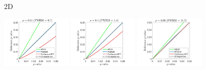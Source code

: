 \documentclass{article}
\begin{document}
\begin{figure}[!htp]
\centering
\begin{sideways}
\phantom{------------------}2D
\end{sideways}
\includegraphics[trim=80 5 80 5, clip,width=0.3\textwidth]{figure/2D_rho0.01_disc.jpg}
\includegraphics[trim=80 5 80 5, clip,width=0.3\textwidth]{figure/2D_rho0.5_disc.jpg}
\includegraphics[trim=100 5 100 5, clip,width=0.3\textwidth]{figure/2D_rho0.99_disc.jpg}


\end{figure}
\end{document}

